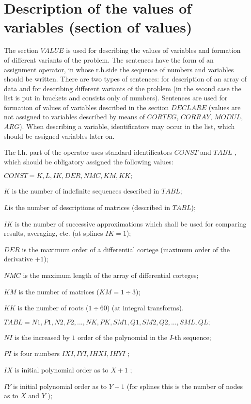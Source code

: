 \section{ Description of the values of variables (section of values)}

The section $VALUE$ is used for describing the values of variables and
formation of different variants of the problem. The sentences have the form
of an assignment operator, in whose r.h.side the sequence of numbers and
variables should be written. There are two types of sentences: for
description of an array of data and for describing different variants of the
problem (in the second case the list is put in brackets and consists only of
numbers). Sentences are used for formation of values of variables described
in the section $DECLARE$ (values are not assigned to variables described by
means of $CORTEG$, $CORRAY$, $MODUL$, $ARG$). When describing a variable,
identificators may occur in the list, which should be assigned variables
later on.

The l.h. part of the operator uses standard identificators $CONST$ and $TABL$%
, which should be obligatory assigned the following values:

$CONST=K,L,IK,DER,NMC,KM,KK;$

$K$ is the number of indefinite sequences described in $TABL$;

$L$is the number of descriptions of matrices (described in $TABL$);

$IK$ is the number of successive approximations which shall be used for
comparing results, averaging, etc. (at splines $IK=1$);

$DER$ is the maximum order of a differential cortege (maximum order of the
derivative $+1$);

$NMC$ is the maximum length of the array of differential corteges;

$KM$ is the number of matrices ($KM=1\div 3$);

$KK$ is the number of roots ($1\div 60$) (at integral transforms).

$TABL=N1,P1,N2,P2,...,NK,PK,SM1,Q1,SM2,Q2,...,SML,QL;$

$NI$ is the increased by $1$ order of the polynomial in the $I$-th sequence;

$PI$ is four numbers $IXI,IYI,IHXI,IHYI$ ;

$IX$ is initial polynomial order as to $X+1$ ;

$IY$ is initial polynomial order as to $Y+1$ (for splines this is the number
of nodes as to $X$ and $Y$ );

